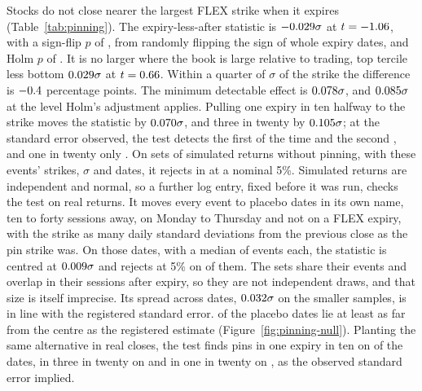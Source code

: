 \documentclass[11pt]{article}
\begin{document}


Stocks do not close nearer the largest FLEX strike when it expires
(Table~\ref{tab:pinning}). The expiry-less-after statistic is $-0.029\sigma$ at
$t=-1.06$, with a sign-flip $p$ of \PinFlipP{}, from randomly flipping the sign of whole
expiry dates, and Holm $p$ of \PinHolm{}. It is no
larger where the book is large relative to trading, top tercile less bottom
$0.029\sigma$ at $t=0.66$. Within a quarter of $\sigma$ of the strike the
difference is $-0.4$ percentage points. The minimum detectable effect is
$0.078\sigma$, and $0.085\sigma$ at the level Holm's adjustment applies. Pulling one expiry in ten halfway to the strike moves the statistic by
$0.070\sigma$, and three in twenty by $0.105\sigma$; at the standard error
observed, the test detects the first \PinPowerTen{} of the time and the second
\PinPowerSeven{}, and one in twenty only \PinPowerTwenty{}. On \PinSimWorlds{} sets of
simulated returns without pinning, with these events' strikes, $\sigma$ and dates, it
rejects in \PinSimSize{} at a nominal 5\%. Simulated returns are independent and
normal, so a further log entry, fixed before it was run, checks the test on real returns.
It moves every event to \PinNullOffsets{} placebo dates in its own name, ten to forty
sessions away, on Monday to Thursday and not on a FLEX expiry, with the strike as many
daily standard deviations from the previous close as the pin strike was. On those dates,
with a median of \PinNullEvents{} events each, the statistic is centred at
$0.009\sigma$ and rejects at 5\% on \PinNullSize{} of them. The sets share their
events and overlap in their sessions after expiry, so they are not independent draws, and
that size is itself imprecise. Its spread across
dates, $0.032\sigma$ on the smaller samples, is in line with the registered
standard error. \PinNullShare{} of the placebo dates lie at least as far from the centre
as the registered estimate (Figure~\ref{fig:pinning-null}). Planting the same alternative
in real closes, the test finds
pins in one expiry in ten on \PinNullPowerTen{} of the dates, in three in twenty on
\PinNullPowerSeven{} and in one in twenty on \PinNullPowerTwenty{}, as the observed
standard error implied.
\end{document}
